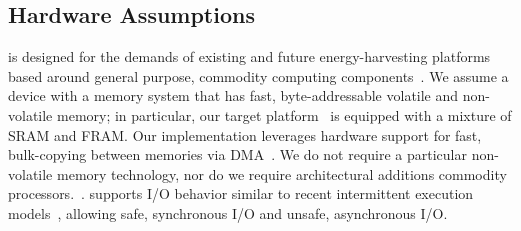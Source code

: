 \subsection{Hardware Assumptions}
\label{sec:background_hardware}

\sys is designed for the demands of existing and future energy-harvesting platforms based around general purpose, commodity computing components~\cite{wisp,msp430datasheet}. We assume a device with a memory system that has fast, byte-addressable volatile and non-volatile memory; in particular, our target platform~\cite{wisp} is equipped with a mixture of SRAM and FRAM. Our implementation leverages hardware support for fast, bulk-copying between memories via DMA~\cite{msp430datasheet}. We do not require a particular non-volatile memory technology, nor do we require architectural additions commodity processors.~\cite{su_date_2017,ratchet,quickrecall,nvp}. \sys supports I/O behavior similar to recent intermittent execution models~\cite{alpaca,chain}, allowing safe, synchronous I/O and unsafe, asynchronous I/O.